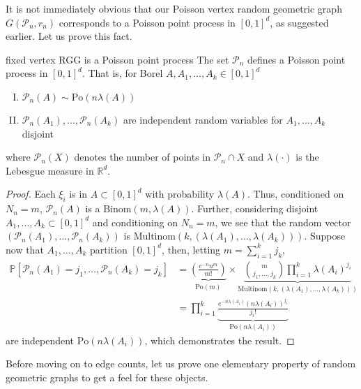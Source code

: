 \documentclass{article}
\begin{document}
It is not immediately obvious that our Poisson vertex random geometric graph $G(\mathcal{P}_n, r_n)$ corresponds 
to a Poisson point process in $[0,1]^d$, as suggested earlier. Let us prove this fact. 

\begin{proposition}[]{fixed vertex RGG is a Poisson point process}
    The set $\mathcal{P}_n$ defines a Poisson point process in $[0,1]^d$. That is, for Borel $A, A_1, \dots, A_k \in [0,1]^d$ 
    \begin{enumerate}[(I)]
        \item $\mathcal{P}_n(A) \sim \text{Po}(n\lambda(A))$
        \item $\mathcal{P}_n(A_1), \dots, \mathcal{P}_n(A_k)$ are independent random variables for $A_1, \dots, A_k$ disjoint
    \end{enumerate}
    where $\mathcal{P}_n(X)$ denotes the number of points in $\mathcal{P}_n \cap X$ and $\lambda(\cdot)$ is the Lebesgue 
    measure in $\mathbb{R}^d$. 
\end{proposition}

\begin{proof}
    Each $\xi_i$ is in $A \subset [0,1]^d$ with probability $\lambda(A)$. Thus, conditioned on $N_n = m$, $\mathcal{P}_n(A)$ 
    is a $\text{Binom}(m, \lambda(A))$. Further, considering disjoint $A_1, \dots, A_k \subset [0,1]^d$ and 
    conditioning on $N_n = m$, we see that the random vector $(\mathcal{P}_n(A_1), \dots, \mathcal{P}_n(A_k))$ is 
    $\text{Multinom}(k, (\lambda(A_1), \dots, \lambda(A_k)))$. Suppose now that $A_1, \dots, A_k$ partition $[0,1]^d$, 
    then, letting $m = \sum_{i=1}^k j_k$,
    \begin{align*}
        \mathbb{P}[\mathcal{P}_n(A_1) = j_1, \dots, \mathcal{P}_n(A_k) = j_k] &= 
        \underbrace{\left(\frac{e^{-n}n^m}{m!}\right)}_{\text{Po}(m)} \times 
        \underbrace{\binom{m}{j_1, \dots, j_k}\prod_{i=1}^k \lambda(A_i)^{j_i}}_{\text{Multinom}(k, (\lambda(A_1), \dots, \lambda(A_k)))} \\ 
        &= \prod_{i=1}^k \underbrace{\frac{e^{-n\lambda(A_i)}(n\lambda(A_i))^{j_i}}{j_i!}}_{\text{Po}(n\lambda(A_i))}
    \end{align*}
    are independent $\text{Po}(n\lambda(A_i))$, which demonstrates the result.
\end{proof}

Before moving on to edge counts, let us prove one elementary property of random geometric graphs to get a feel 
for these objects. 
\end{document}
